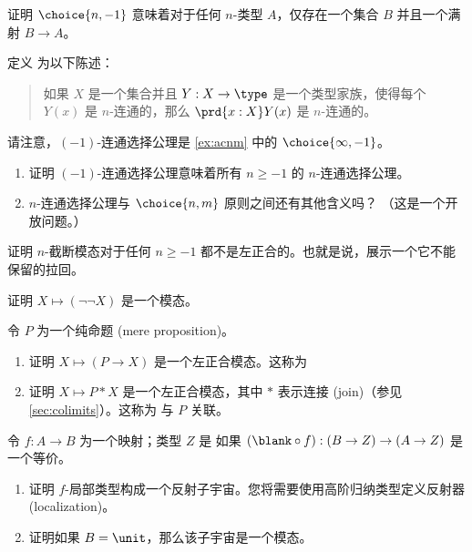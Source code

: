 \begin{ex}\label{ex:acnm-surjset}
证明 $\choice{n,-1}$ 意味着对于任何 $n$-类型 $A$，仅存在一个集合 $B$ 并且一个满射 $B\to A$。
\end{ex}

\begin{ex}\label{ex:acconn}
定义 
%
%
为以下陈述：
\begin{quote}
    如果 $X$ 是一个集合并且 $Y:X\to \type$ 是一个类型家族，使得每个 $Y(x)$ 是 $n$-连通的，那么 $\prd{x:X} Y(x)$ 是 $n$-连通的。
\end{quote}
请注意，$(-1)$-连通选择公理是 \cref{ex:acnm} 中的 $\choice{\infty,-1}$。
\begin{enumerate}
    \item 证明 $(-1)$-连通选择公理意味着所有 $n\ge -1$ 的 $n$-连通选择公理。
    \item $n$-连通选择公理与 $\choice{n,m}$ 原则之间还有其他含义吗？
    （这是一个开放问题。）
\end{enumerate}
\end{ex}

\begin{ex}\label{ex:n-truncation-not-left-exact}
证明 $n$-截断模态对于任何 $n\ge -1$ 都不是左正合的。也就是说，展示一个它不能保留的拉回。
\end{ex}

\begin{ex}\label{ex:double-negation-modality}
证明 $X\mapsto (\neg\neg X)$ 是一个模态。%
\end{ex}

\begin{ex}\label{ex:prop-modalities}
令 $P$ 为一个纯命题 (mere proposition)。
\begin{enumerate}
    \item 证明 $X\mapsto (P\to X)$ 是一个左正合模态。这称为 %
    \item 证明 $X\mapsto P*X$ 是一个左正合模态，其中 $*$ 表示连接 (join)（参见 \cref{sec:colimits}）。这称为 %
    与 $P$ 关联。
\end{enumerate}
\end{ex}

\begin{ex}\label{ex:f-local-type}
令 $f:A\to B$ 为一个映射；类型 $Z$ 是 
%
%
如果 $(\blank\circ f):(B\to Z) \to (A\to Z)$ 是一个等价。
\begin{enumerate}
    \item 证明 $f$-局部类型构成一个反射子宇宙。您将需要使用高阶归纳类型定义反射器 (localization)。
    \item 证明如果 $B=\unit$，那么该子宇宙是一个模态。
\end{enumerate}
\end{ex}

